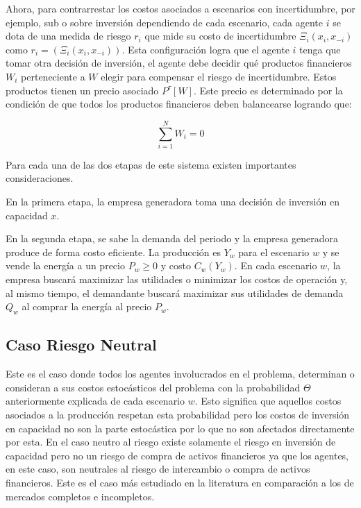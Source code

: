 Ahora, para contrarrestar los costos asociados a escenarios con incertidumbre, por ejemplo, sub o sobre inversión dependiendo de cada escenario, cada agente $i$ se dota de una medida de riesgo $r_{i}$ que mide su costo de incertidumbre $\Xi_{i}(x_{i},x_{-i})$ como $r_{i}=(\Xi_{i}(x_{i},x_{-i}))$. Esta configuración logra que el agente $i$ tenga que tomar otra decisión de inversión, el agente debe decidir qué productos financieros  $W_i$ perteneciente a $W$ elegir para compensar el riesgo de incertidumbre. Estos productos tienen un precio asociado $P^{\tau}[W]$. Este precio es determinado por la condición de que todos los productos financieros deben balancearse logrando que:

$$\sum_{i=1}^{N}W_{i} = 0$$

Para cada una de las dos etapas de este sistema existen importantes consideraciones.
\vspace{2.5mm}

En la primera etapa, la empresa generadora toma una decisión de inversión en capacidad $x$. 
\vspace{2.5mm}

En la segunda etapa, se sabe la demanda del periodo y la empresa generadora produce de forma costo eficiente. La producción es $Y_{w}$ para el escenario $w$ y se vende la energía a un precio $P_{w}\geq 0$ y costo $C_{w}(Y_{w})$. En cada escenario $w$, la empresa buscará maximizar las utilidades o minimizar los costos de operación y, al mismo tiempo, el demandante buscará maximizar sus utilidades de demanda $Q_{w}$ al comprar la energía al precio $P_{w}$.

\subsection{Caso Riesgo Neutral}

Este es el caso donde todos los agentes involucrados en el problema, determinan o consideran a sus costos estocásticos del problema con la probabilidad $\Theta$ anteriormente explicada de cada escenario $w$. Esto significa que aquellos costos asociados a la producción respetan esta probabilidad pero los costos de inversión en capacidad no son la parte estocástica por lo que no son afectados directamente por esta. En el caso neutro al riesgo existe solamente el riesgo en inversión de capacidad pero no un riesgo de compra de activos financieros ya que los agentes, en este caso, son neutrales al riesgo de intercambio o compra de activos financieros. Este es el caso más estudiado en la literatura en comparación a los de mercados completos e incompletos.
\vspace{2.5mm}

